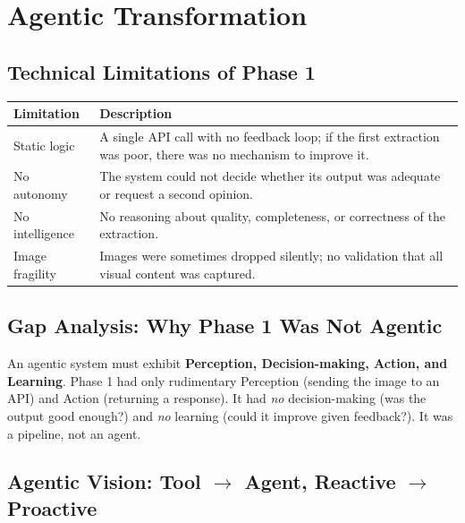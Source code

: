 \documentclass[12pt,a4paper]{article}
\begin{document}
\section{Agentic Transformation}

\subsection{Technical Limitations of Phase 1}

\begin{center}
\begin{tabular}{lp{10cm}}
  \toprule
  \textbf{Limitation} & \textbf{Description} \\
  \midrule
  Static logic      & A single API call with no feedback loop; if the first extraction was poor,
                      there was no mechanism to improve it. \\
  No autonomy       & The system could not decide whether its output was adequate or request a
                      second opinion. \\
  No intelligence   & No reasoning about quality, completeness, or correctness of the
                      extraction. \\
  Image fragility   & Images were sometimes dropped silently; no validation that all visual
                      content was captured. \\
  \bottomrule
\end{tabular}
\end{center}

\subsection{Gap Analysis: Why Phase 1 Was Not Agentic}

An agentic system must exhibit \textbf{Perception, Decision-making, Action, and Learning}.
Phase 1 had only rudimentary Perception (sending the image to an API) and Action (returning a
response). It had \emph{no} decision-making (was the output good enough?) and \emph{no} learning
(could it improve given feedback?). It was a pipeline, not an agent.

\subsection{Agentic Vision: Tool $\rightarrow$ Agent, Reactive $\rightarrow$ Proactive}
\end{document}
